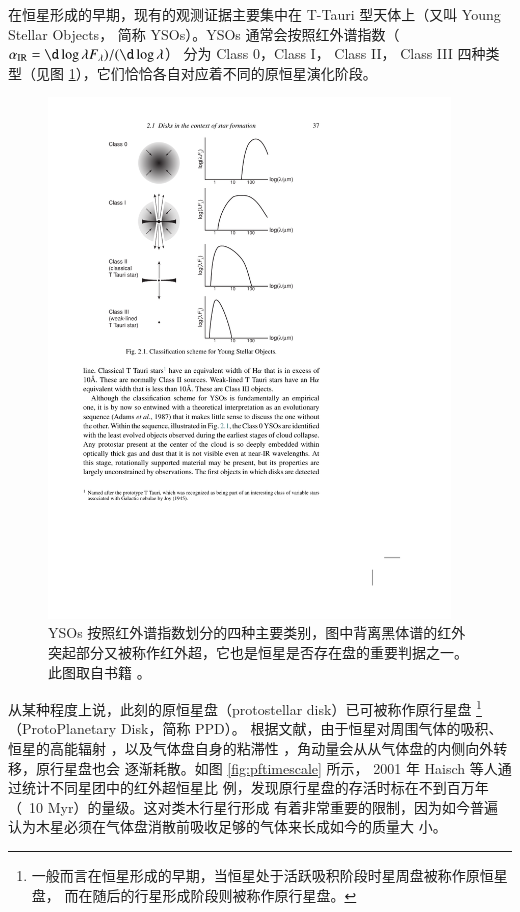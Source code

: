 在恒星形成的早期，现有的观测证据主要集中在 T-Tauri 型天体上（又叫 Young Stellar Objects，
简称 YSOs）。YSOs 通常会按照红外谱指数（$\alpha_\tif{IR} = \d\log \lambda F_\lambda)/(\d\log \lambda$）
分为 Class 0，Class \RN{1}， Class \RN{2}， Class \RN{3} 四种类型\cite{Andreetal2000}（见图
 \ref{fig:ysostage}），它们恰恰各自对应着不同的原恒星演化阶段。

\begin{figure}[t]
\centering
\includegraphics[width=0.95\textwidth]{figures/chapter1/fig9_ysostages.pdf}
\caption[YSOs 按照红外谱指数划分的四种主要类别，版权所有：Armitage P.。]{YSOs 按照红外谱指数划分的四种主要类别，图中背离黑体谱的红外突起部分又被称作红外超，它也是恒星是否存在盘的重要判据之一。此图取自书籍 。}
\label{fig:ysostage}
\end{figure}

从某种程度上说，此刻的原恒星盘（protostellar disk）已可被称作原行星盘
\footnote{一般而言在恒星形成的早期，当恒星处于活跃吸积阶段时星周盘被称作原恒星盘，
而在随后的行星形成阶段则被称作原行星盘。}（ProtoPlanetary Disk，简称 PPD）。
根据文献，由于恒星对周围气体的吸积\cite{Pringle1981}、恒星的高能辐射
\cite{Johnstone1998,Hollenbach1994}，以及气体盘自身的粘滞性
\cite{Shakura1973,Gammie1996}，角动量会从从气体盘的内侧向外转移，原行星盘也会
逐渐耗散。如图 \ref{fig:pftimescale} 所示， 2001 年 Haisch 等人通过统计不同星团中的红外超恒星比
例，发现原行星盘的存活时标在不到百万年（~10 Myr）的量级\cite{Haisch2001}。这对类木行星行形成
有着非常重要的限制，因为如今普遍认为木星必须在气体盘消散前吸收足够的气体来长成如今的质量大
小\cite{WilliamsCieza2011}。

